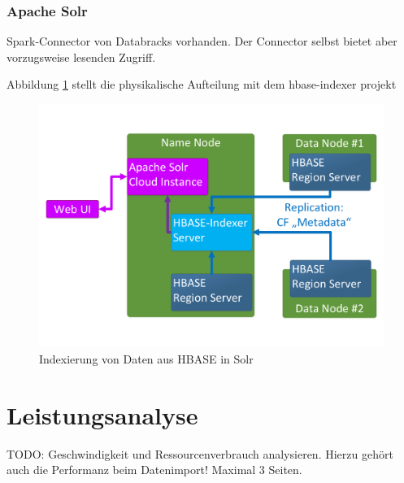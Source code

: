 \subsubsection{Apache Solr}
Spark-Connector von Databracks vorhanden. Der Connector selbst bietet aber vorzugsweise lesenden Zugriff.

\noindent
Abbildung \ref{fig:hbase_solr_indexing} stellt die physikalische Aufteilung mit dem hbase-indexer projekt

\begin{figure}[ht]
  \centering
  \includegraphics[width=\textwidth]{./resource/hbase_solr_indexierung.pdf}
  \caption{Indexierung von Daten aus HBASE in Solr}
  \label{fig:hbase_solr_indexing}
\end{figure}


\section{Leistungsanalyse}
TODO: Geschwindigkeit und Ressourcenverbrauch analysieren. Hierzu gehört auch die Performanz beim Datenimport! Maximal 3 Seiten.

